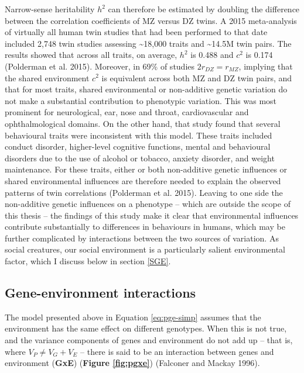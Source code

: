 \documentclass[
]{book}
\begin{document}
Narrow-sense heritability \(h^2\) can therefore be estimated by doubling the difference between the correlation coefficients of MZ versus DZ twins. A 2015 meta-analysis of virtually all human twin studies that had been performed to that date included 2,748 twin studies assessing \textasciitilde18,000 traits and \textasciitilde14.5M twin pairs. The results showed that across all traits, on average, \(h^2\) is 0.488 and \(c^2\) is 0.174 (Polderman et al. 2015). Moreover, in 69\% of studies \(2r_{DZ} = r_{MZ}\), implying that the shared environment \(c^2\) is equivalent across both MZ and DZ twin pairs, and that for most traits, shared environmental or non-additive genetic variation do not make a substantial contribution to phenotypic variation. This was most prominent for neurological, ear, nose and throat, cardiovascular and ophthalmological domains. On the other hand, that study found that several behavioural traits were inconsistent with this model. These traits included conduct disorder, higher-level cognitive functions, mental and behavioural disorders due to the use of alcohol or tobacco, anxiety disorder, and weight maintenance. For these traits, either or both non-additive genetic influences or shared environmental influences are therefore needed to explain the observed patterns of twin correlations (Polderman et al. 2015). Leaving to one side the non-additive genetic influences on a phenotype -- which are outside the scope of this thesis -- the findings of this study make it clear that environmental influences contribute substantially to differences in behaviours in humans, which may be further complicated by interactions between the two sources of variation. As social creatures, our social environment is a particularly salient environmental factor, which I discuss below in section \ref{SGE}.

\hypertarget{gene-environment-interactions}{%
\subsection{Gene-environment interactions}\label{gene-environment-interactions}}

The model presented above in Equation \eqref{eq:pge-simp} assumes that the environment has the same effect on different genotypes. When this is not true, and the variance components of genes and environment do not add up -- that is, where \(V_{P} \neq V_{G} + V_{E}\) -- there is said to be an interaction between genes and environment (\textbf{GxE}) (\textbf{Figure \ref{fig:pgxe}}) (Falconer and Mackay 1996).
\end{document}

